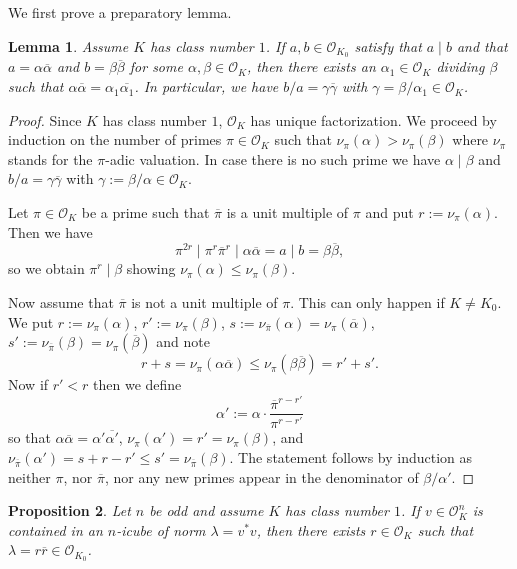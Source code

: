 \documentclass[11pt]{amsart}
\newtheorem{proposition}{Proposition}[section]
\newtheorem{lemma}[proposition]{Lemma}
\theoremstyle{definition}
\theoremstyle{remark}
\begin{document}
We first prove a preparatory lemma.
\begin{lemma}\label{quotientisnorm}
Assume $K$ has class number $1$. If $a,b\in\mathcal{O}_{K_0}$ satisfy that $a\mid b$ and that $a=\alpha\overline\alpha$ and $b=\beta\overline\beta$ for some $\alpha,\beta\in \mathcal{O}_K$, then there exists an $\alpha_1\in \mathcal{O}_K$ dividing $\beta$ such that $\alpha\overline{\alpha}=\alpha_1\overline{\alpha_1}$. In particular, we have $b/a=\gamma\overline\gamma$ with $\gamma=\beta/\alpha_1\in \mathcal{O}_K$.
\end{lemma}
\begin{proof}
Since $K$ has class number $1$, $\mathcal{O}_K$ has unique factorization. We proceed by induction on the number of primes $\pi\in \mathcal{O}_K$ such that $\nu_\pi(\alpha)>\nu_\pi(\beta)$ where $\nu_\pi$ stands for the $\pi$-adic valuation. In case there is no such prime we have $\alpha\mid \beta$ and $b/a=\gamma\overline{\gamma}$ with $\gamma:=\beta/\alpha\in\mathcal{O}_K$. 

Let $\pi\in\mathcal{O}_K$ be a prime such that $\overline\pi$ is a unit multiple of $\pi$ and put $r:=\nu_\pi(\alpha)$. Then we have \[\pi^{2r}\mid \pi^r\overline{\pi}^r\mid \alpha\overline\alpha=a\mid b=\beta\overline\beta,\] so we obtain $\pi^r\mid \beta$ showing $\nu_\pi(\alpha)\leq \nu_\pi(\beta)$.

Now assume that $\overline\pi$ is not a unit multiple of $\pi$. This can only happen if $K\neq K_0$. We put $r:=\nu_\pi(\alpha)$, $r':=\nu_\pi(\beta)$, $s:=\nu_{\overline{\pi}}(\alpha)=\nu_\pi(\overline{\alpha})$, $s':=\nu_{\overline{\pi}}(\beta)=\nu_\pi(\overline{\beta})$ and note
\[r+s=\nu_\pi(\alpha\overline{\alpha})\leq \nu_\pi(\beta\overline{\beta})=r'+s'.\]
Now if $r'<r$ then we define
\[\alpha':=\alpha\cdot\frac{\overline{\pi}^{r-r'}}{\pi^{r-r'}}\]
so that $\alpha\overline{\alpha}=\alpha'\overline{\alpha'}$, $\nu_\pi(\alpha')=r'=\nu_\pi(\beta)$, and $\nu_{\overline{\pi}}(\alpha')=s+r-r'\leq s'=\nu_{\overline{\pi}}(\beta)$. The statement follows by induction as neither $\pi$, nor $\overline{\pi}$, nor any new primes appear in the denominator of $\beta/\alpha'$.
\end{proof}


\begin{proposition}\label{2kp1general}
Let $n$ be odd and assume $K$ has class number $1$. If $v\in \mathcal{O}_K^n$ is contained in an $n$-icube of norm $\lambda=v^*v$, then there exists $r\in \mathcal{O}_K$ such that $\lambda=r\overline r\in \mathcal{O}_{K_0}$.
\end{proposition}
\end{document}
